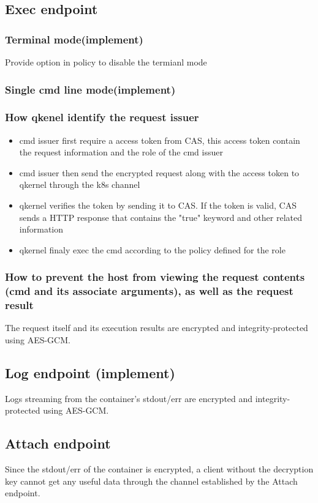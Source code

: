 \subsection{Exec endpoint}
\subsubsection{Terminal mode(implement)}
Provide option in policy to disable the termianl mode


\subsubsection{Single cmd line mode(implement)}
\subsubsection{How qkenel identify the request issuer}
\begin{itemize}
    \item  cmd issuer first require a access token from CAS, this access token contain the request information and the role of the cmd issuer
    \item  cmd issuer then send the encrypted request along with the access token to qkernel through the k8s channel
    \item  qkernel verifies the token by sending it to CAS. If the token is valid, CAS sends a HTTP response that contains the "true" keyword and other related information
    \item  qkernel finaly exec the cmd according to the policy defined for the role
\end{itemize}
\subsubsection{How to prevent the host from viewing the request contents (cmd and its associate arguments), as well as the request result}
The request itself and its execution results are encrypted and integrity-protected using AES-GCM.

\subsection{Log endpoint (implement)}
Logs streaming from the container's stdout/err are encrypted and integrity-protected using AES-GCM.
\subsection{Attach endpoint}
Since the stdout/err of the container is encrypted, a client without the decryption key cannot get any useful data through the channel established by the Attach endpoint.

